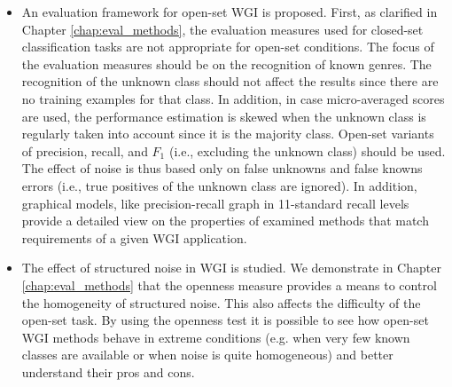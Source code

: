 \begin{itemize}
    
    \item An evaluation framework for open-set WGI is proposed. First, as clarified in Chapter \ref{chap:eval_methods}, the evaluation measures used for closed-set classification tasks are not appropriate for open-set conditions. The focus of the evaluation measures should be on the recognition of known genres. The recognition of the unknown class should not affect the results since there are no training examples for that class. In addition, in case micro-averaged scores are used, the performance estimation is skewed when the unknown class is regularly taken into account since it is the majority class. Open-set variants of precision, recall, and $F_1$ (i.e., excluding the unknown class) should be used. The effect of noise is thus based only on false unknowns and false knowns errors (i.e., true positives of the unknown class are ignored). In addition, graphical models, like precision-recall graph in 11-standard recall levels provide a detailed view on the properties of examined methods that match requirements of a given WGI application. 
    
    \item The effect of structured noise in WGI is studied. We demonstrate in Chapter \ref{chap:eval_methods} that the openness measure provides a means to control the homogeneity of structured noise. This also affects the difficulty of the open-set task. By using the openness test it is possible to see how open-set WGI methods behave in extreme conditions (e.g. when very few known classes are available or when noise is quite homogeneous) and better understand their pros and cons.
    

\end{itemize}
